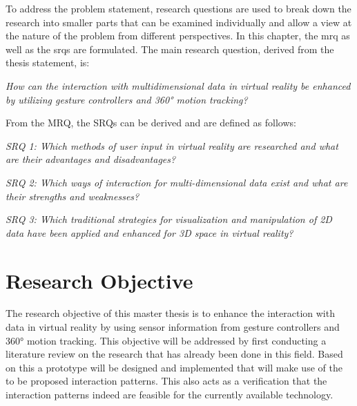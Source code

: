 To address the problem statement, research questions are used to break down the research into smaller parts that can be examined individually and allow a view at the nature of the problem from different perspectives.
In this chapter, the \gls{mrq} as well as the \glspl{srq} are formulated. \newline
The main research question, derived from the thesis statement, is:
\begin{framed}
	\textit{How can the interaction with multidimensional data in virtual reality be enhanced by utilizing gesture controllers and 360° motion tracking?}
\end{framed} \label{MRQ}
From the MRQ, the SRQs can be derived and are defined as follows:
\begin{framed}
	\textit{SRQ 1: Which methods of user input in virtual reality are researched and what are their advantages and disadvantages?}
\end{framed} \label{SRQ1}
\begin{framed}
	\textit{SRQ 2: Which ways of interaction for multi-dimensional data exist and what are their strengths and weaknesses?}
\end{framed} \label{SRQ2}
\begin{framed}
	\textit{SRQ 3: Which traditional strategies for visualization and manipulation of 2D data have been applied and enhanced for 3D space in virtual reality?}
\end{framed} \label{SRQ3}
 


\section{Research Objective}

The research objective of this master thesis is to enhance the interaction with data in virtual reality by using sensor information from gesture controllers and 360° motion tracking.\newline
This objective will be addressed by first conducting a literature review on the research that has already been done in this field. Based on this a prototype will be designed and implemented that will make use of the to be proposed interaction patterns. This also acts as a verification that the interaction patterns indeed are feasible for the currently available technology.


